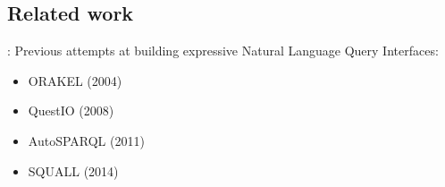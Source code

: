 \documentclass[logoontitle,tabu,supertabular,aspectratio=43]{preney-uwindsor-beamer}
\begin{document}
    \subsection{Related work}
    \begin{frame}{\insertsection: \insertsubsection}
        Previous attempts at building expressive Natural Language Query Interfaces:
        \begin{itemize}
            \item ORAKEL (2004) \cite{cimiano2007orakel}
            \item QuestIO (2008) \cite{tablan2008natural}
            \item AutoSPARQL (2011) \cite{lehmann2011autosparql}
            \item SQUALL (2014) \cite{ferre2014squall}
        \end{itemize}
    \end{frame}






\end{document}

